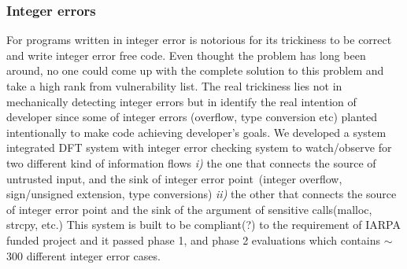 \documentclass[letterpaper, 10pt]{article}
\begin{document}
\begin{small}
\subsubsection*{Integer errors} 

For programs written in integer error is notorious for its trickiness to be
correct and write integer error free code. Even thought the problem has long
been around, no one could come up with the complete solution to this problem
and take a high rank from vulnerability list. 
%
The real trickiness lies not in mechanically detecting integer errors but in
identify the real intention of developer since some of integer errors
(overflow, type conversion etc) planted intentionally to make code achieving
developer's goals.
%
We developed a system integrated DFT system with integer error checking system
to watch/observe for two different kind of information flows {\it i)} the one
that connects the source of untrusted input, and the sink of integer error
point~(integer overflow, sign/unsigned extension, type conversions) {\it ii)}
the other that connects the source of integer error point and the sink of the
argument of sensitive calls(malloc, strcpy, etc.)
% 
This system is built to be compliant(?) to the requirement of IARPA funded
project and it passed phase 1, and phase 2 evaluations which contains $\sim$
300 different integer error cases.

\end{small}
\newpage



\end{document}
